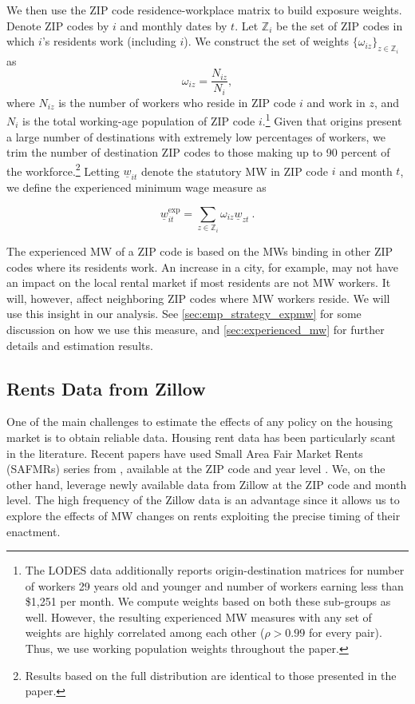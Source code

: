 We then use the ZIP code residence-workplace matrix to build exposure weights. Denote 
ZIP codes by $i$ and monthly dates by $t$. Let $\mathds{Z}_i$ be the set of ZIP codes in 
which $i$'s residents work (including $i$). We construct the set of weights 
$\{\omega_{iz}\}_{z \in \mathds{Z}_i}$ as $$\omega_{iz} = \frac{N_{iz}}{N_i} , $$ where 
$N_{iz}$ is the number of workers who reside in ZIP code $i$ and work in $z$, and $N_i$ 
is the total working-age population of ZIP code $i$.\footnote{The LODES data additionally 
	reports origin-destination matrices for number of workers 29 years old and younger  
	and number of workers earning less than \$1,251 per month. We compute weights based 
	on both these sub-groups as well. However, the resulting experienced MW measures with
	any set of weights are highly correlated among each other ($\rho>0.99$ for every pair).
	Thus, we use working population weights throughout the paper.} 
Given that origins present a large number of destinations with extremely low percentages of 
workers, we trim the number of destination ZIP codes to those making up to 90 percent of the 
workforce.\footnote{Results based on the full distribution are identical to those presented
	in the paper.} 
Letting $\underline{w}_{it}$ denote the statutory MW in ZIP code $i$ and month $t$, we 
define the experienced minimum wage measure as

\begin{equation}
\underline{w}^{\text{exp}}_{it} = 
\sum_{z \in \mathds{Z}_i} \omega_{iz} \underline{w}_{zt} \ . 
\end{equation}

The experienced MW of a ZIP code is based on the MWs binding in other ZIP codes 
where its residents work. An increase in a city, for example, may not have an impact on 
the local rental market if most residents are not MW workers. It will, however, 
affect neighboring ZIP codes where MW workers reside. We will use this insight in our 
analysis. See \autoref{sec:emp_strategy_expmw} for some discussion on how we use this 
measure, and \autoref{sec:experienced_mw} for further details and estimation results.

\subsection{Rents Data from Zillow}

One of the main challenges to estimate the effects of any policy on the housing market
is to obtain reliable data. Housing rent data has been particularly scant in the 
literature. Recent papers have used Small Area Fair Market Rents (SAFMRs) series from 
\textcite{hud}, available at the ZIP code and year level \parencite{Tidemann2018, 
Yamagishi2019}. We, on the other hand, leverage newly available data from Zillow at the 
ZIP code and month level. The high frequency of the Zillow data is an advantage since it 
allows us to explore the effects of MW changes on rents exploiting the precise timing of 
their enactment.

